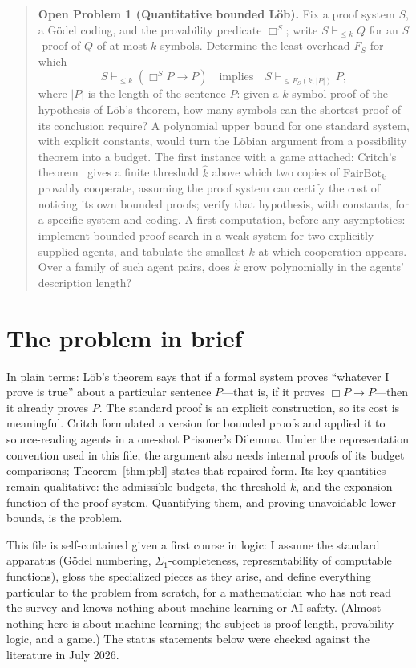 \documentclass[11pt]{amsart}
\theoremstyle{plain}
\theoremstyle{definition}
\begin{document}
\begin{quote}
\textbf{Open Problem 1 (Quantitative bounded L\"ob).}
Fix a proof system $S$, a G\"odel coding, and the provability predicate $\Box^S$; write $S\vdash_{\le k}Q$ for an $S$-proof of $Q$ of at most $k$ symbols. Determine the least overhead $F_S$ for which
\[
   S\vdash_{\le k}(\Box^S P\to P)
   \quad\text{implies}\quad
   S\vdash_{\le F_S(k,|P|)} P,
\]
where $|P|$ is the length of the sentence $P$: given a $k$-symbol proof of the hypothesis of L\"ob's theorem, how many symbols can the shortest proof of its conclusion require? A polynomial upper bound for one standard system, with explicit constants, would turn the L\"obian argument from a possibility theorem into a budget. The first instance with a game attached: Critch's theorem~\cite{critch2016} gives a finite threshold $\hat k$ above which two copies of $\mathrm{FairBot}_k$ provably cooperate, assuming the proof system can certify the cost of noticing its own bounded proofs; verify that hypothesis, with constants, for a specific system and coding. A first computation, before any asymptotics: implement bounded proof search in a weak system for two explicitly supplied agents, and tabulate the smallest $k$ at which cooperation appears. Over a family of such agent pairs, does $\hat k$ grow polynomially in the agents' description length?
\end{quote}


\section{The problem in brief}
\label{sec:brief}



In plain terms: L\"ob's theorem \cite{lob1955} says that if a formal system proves ``whatever I prove is true'' about a particular sentence $P$---that is, if it proves $\Box P\to P$---then it already proves $P$. The standard proof is an explicit construction, so its cost is meaningful. Critch \cite{critch2016} formulated a version for bounded proofs and applied it to source-reading agents in a one-shot Prisoner's Dilemma. Under the representation convention used in this file, the argument also needs internal proofs of its budget comparisons; Theorem~\ref{thm:pbl} states that repaired form. Its key quantities remain qualitative: the admissible budgets, the threshold $\hat k$, and the expansion function of the proof system. Quantifying them, and proving unavoidable lower bounds, is the problem.

This file is self-contained given a first course in logic: I assume the standard apparatus (G\"odel numbering, $\Sigma_1$-completeness, representability of computable functions), gloss the specialized pieces as they arise, and define everything particular to the problem from scratch, for a mathematician who has not read the survey and knows nothing about machine learning or AI safety. (Almost nothing here is about machine learning; the subject is proof length, provability logic, and a game.) The status statements below were checked against the literature in July 2026.
\end{document}
